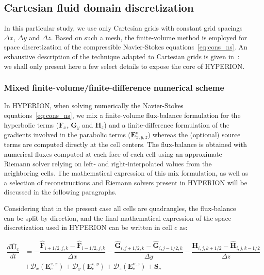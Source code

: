 \subsection{Cartesian fluid domain discretization}\label{ssec:cartesian}

In this particular study, we use only Cartesian grids with constant grid spacings $\Delta x$, $\Delta y$ and $\Delta z$.
Based on such a mesh, the finite-volume method \cite{leveque2002finite} is employed for space discretization of the compressible Navier-Stokes equations~\eqref{eq:cons_ns}.
An exhaustive description of the technique adapted to Cartesian grids is given in~\cite{BRIDELBERTOMEU2021}: we shall only present here a few select details to expose the core of HYPERION.

\subsubsection{Mixed finite-volume/finite-difference numerical scheme}\label{sssec:num_scheme}

In HYPERION, when solving numerically the Navier-Stokes equations~\eqref{eq:cons_ns}, we mix a finite-volume flux-balance formulation for the hyperbolic terms ($\mathbf{F}_x$, $\mathbf{G}_y$ and $\mathbf{H}_z$) and a finite-difference formulation of the gradients involved in the parabolic terms ($\mathbf{E}^{v}_{x,y,z}$) whereas the (optional) source terms are computed directly at the cell centers.
The flux-balance is obtained with numerical fluxes computed at each face of each cell using an approximate Riemann solver \cite{toro2013riemann} relying on left- and right-interpolated values from the neighboring cells.
The mathematical expression of this mix formulation, as well as a selection of reconstructions and Riemann solvers present in HYPERION will be discussed in the following paragraphs.


Considering that in the present case all cells are quadrangles, the flux-balance can be split by direction, and the final mathematical expression of the space discretization used in HYPERION can be written in cell $c$ as:

\begin{equation}
    \begin{split}
        \dfrac{d\overline{\mathbf{U}}_c}{dt} &= -\dfrac{\hat{\mathbf{F}}_{i+1/2,j,k} - \hat{\mathbf{F}}_{i-1/2,j,k}}{\Delta x}
        - \dfrac{\hat{\mathbf{G}}_{i,j+1/2,k} - \hat{\mathbf{G}}_{i,j-1/2,k}}{\Delta y}
        - \dfrac{\hat{\mathbf{H}}_{i,j,k+1/2} - \hat{\mathbf{H}}_{i,j,k-1/2}}{\Delta z}
        \\
        &+ \mathcal{D}_x\left( \mathbf{E}^{v,x}_{c} \right)
         + \mathcal{D}_y\left( \mathbf{E}^{v,y}_{c} \right)
         + \mathcal{D}_z\left( \mathbf{E}^{v,z}_{c} \right)
         + \mathbf{S}_c
    \end{split}
    \label{eq:fvm_discretization}
\end{equation}


